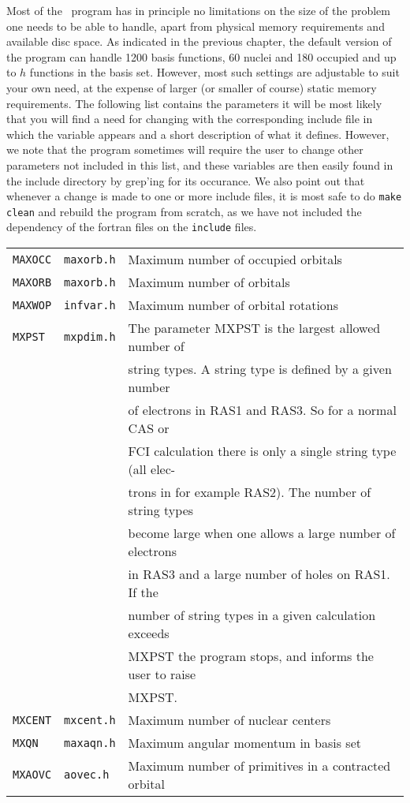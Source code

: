 Most of the \siraba\ program has in principle no limitations on the
size of the problem one needs to be able to handle, apart from
physical memory requirements and available disc space. As indicated in
the previous chapter, the default version of the program can handle
1200 basis functions, 60 nuclei and 180 occupied and up to $h$
functions in the basis set. However, most such settings are adjustable
to suit your own need, at the expense of larger (or smaller of course)
static memory requirements. The following list contains the parameters
it will be most likely that you will find a need for changing with the
corresponding include file in which the variable appears and a
short description of what it defines. However, we note that the
program sometimes will require the user to change other parameters not
included in this list, and these variables are then easily found in the
include directory by grep'ing for its occurance. We also point out
that whenever a change is made to one or more include files, it is
most safe to do \verb|make clean| and rebuild the program from
scratch, as we have not included the dependency of the fortran files
on the \verb|include| files.

\bigskip

\begin{tabular}{lll}
\verb|MAXOCC| & \verb|maxorb.h| & Maximum number of occupied
orbitals\index{occupied orbitals}\index{limits}\\
\verb|MAXORB| & \verb|maxorb.h| & Maximum number of orbitals\index{orbitals}\index{limits}\\
\verb|MAXWOP| & \verb|infvar.h| & Maximum number of orbital
rotations\index{orbital rotations}\index{limits}\\
\verb|MXPST| & \verb|mxpdim.h| & The parameter MXPST is the largest
allowed number\index{string numbers}\index{limits} of \\ && string types.
A string type is defined by a given number \\&& of electrons in RAS1 and 
RAS3. So for a normal CAS or \\ &&  FCI calculation there is only a
single string 
type (all elec-\\&&trons in for example RAS2). The number of string types
 \\ & & become large when one allows a large number of electrons
 \\ &&  in  RAS3  and a large number of holes on RAS1. If the 
\\ && number of  string types
in a given calculation exceeds  \\&&  MXPST the program stops, and
informs the user to raise\\&& MXPST.\\
\verb|MXCENT| & \verb|mxcent.h| & Maximum number of nuclear
centers\index{atomic centers}\index{limits}\\ 
\verb|MXQN| & \verb|maxaqn.h| & Maximum angular momentum in basis
set\index{angular momentum}\index{limits}\\
\verb|MXAOVC| & \verb|aovec.h| & Maximum number of primitives in a
contracted orbital\index{primitive orbitals}\index{limits}
\end{tabular}

